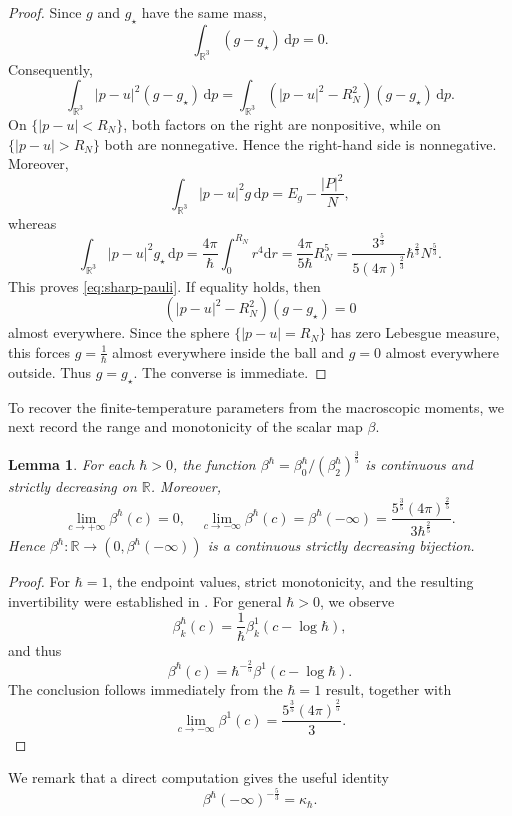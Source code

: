 \documentclass[10pt,reqno]{amsart}
\numberwithin{equation}{section}
\newtheorem{lemma}{Lemma}[section]
\theoremstyle{definition}
\newcommand{\R}{\mathbb R}
\newcommand{\dd}{\mathrm d}
\newcommand{\dpp}{\mathrm{d}p}
\newcommand{\kappah}{\kappa_{\hbar}}
\newcommand{\bq}{\begin{equation}}
\newcommand{\eq}{\end{equation}}
\begin{document}
\begin{proof}
Since $g$ and $g_\star$ have the same mass,
\[
 \int_{\R^3}(g-g_\star)\,\dpp=0.
\]
Consequently,
\[
\int_{\R^3}|p-u|^2(g-g_\star)\,\dpp =  \int_{\R^3}(|p-u|^2-R_N^2)(g-g_\star)\,\dpp.
\]
On $\{|p-u|<R_N\}$, both factors on the right are nonpositive, while on $\{|p-u|>R_N\}$ both are nonnegative.  Hence the right-hand side is nonnegative.  Moreover,
\[
 \int_{\R^3}|p-u|^2g\,\dpp=E_g-\frac{|P|^2}{N},
\]
whereas
\[
 \int_{\R^3}|p-u|^2g_\star\,\dpp  =\frac{4\pi}{\hbar}\int_0^{R_N}r^4\dd r  =\frac{4\pi}{5\hbar}R_N^5 =\frac{3^{\frac53}}{5(4\pi)^{\frac23}}\hbar^{\frac23}N^{\frac53}.
\]
This proves \eqref{eq:sharp-pauli}.  If equality holds, then
\[
 (|p-u|^2-R_N^2)(g-g_\star)=0
\]
almost everywhere. Since the sphere $\{|p-u|=R_N\}$ has zero Lebesgue measure, this forces $g=\frac1\hbar $ almost everywhere inside the ball and $g=0$ almost everywhere outside. Thus $g=g_\star$.  The converse is immediate.
\end{proof}



 


To recover the finite-temperature parameters from the macroscopic moments, we next record the range and monotonicity of the scalar map $\beta$.


\begin{lemma}\label{lem:beta}
For each $\hbar>0$, the function $\beta^{\hbar} = \beta_0^{\hbar}/(\beta_2^{\hbar})^{\frac35}$ is continuous and strictly decreasing on $\R$.  Moreover,
\[
 \lim_{c\to+\infty}\beta^{\hbar}(c)=0,  \quad  \lim_{c\to-\infty}\beta^{\hbar}(c)=\beta^{\hbar}(-\infty) = \frac{5^{\frac35}(4\pi)^{\frac25}}{3\hbar^{\frac25}} .
\]
Hence $\beta^{\hbar}:\R\to(0,\beta^{\hbar}(-\infty))$ is a continuous strictly decreasing bijection.
\end{lemma}

\begin{proof}
For $\hbar=1$, the endpoint values, strict monotonicity, and the resulting invertibility were established in \cite[Lemma 2.1, Proposition 2.1, and Theorem 2.2]{BY20}. For general $\hbar>0$, we observe
\[
 \beta^{\hbar}_{k}(c)  =\frac1\hbar \beta_{k}^1(c-\log\hbar),
\]
and thus
\[
 \beta^{\hbar}(c) =\hbar^{-\frac25}\beta^1(c-\log\hbar).
\]
The conclusion follows immediately from the $\hbar=1$ result, together with
\[
 \lim_{c\to-\infty}\beta^1(c) =\frac{5^{\frac35}(4\pi)^{\frac25}}{3}.
\]
\end{proof}
We remark that a direct computation gives the useful identity
\bq \label{eq:beta-kappa}
 \beta^{\hbar}(-\infty)^{-\frac53}=\kappah.
\eq
\end{document}
